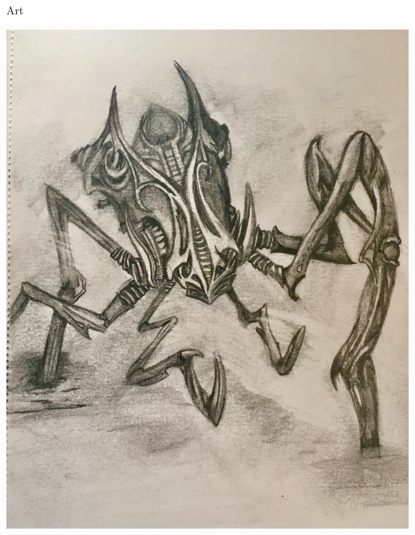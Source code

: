 \documentclass{teamepsilon}
\begin{document}
\begin{frame}{Art}

    \vspace{0.5em}
    \begin{minipage}{0.65\textwidth}
        \includegraphics[height=\textheight-3em]{graphics/spider}
    \end{minipage}%
    \begin{minipage}{0.35\textwidth-1em}

\end{minipage}
\end{frame}
\end{document}

